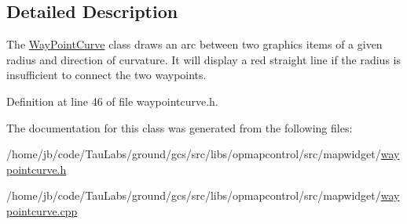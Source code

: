\subsection{\-Detailed \-Description}
\-The \hyperlink{classmapcontrol_1_1_way_point_curve}{\-Way\-Point\-Curve} class draws an arc between two graphics items of a given radius and direction of curvature. \-It will display a red straight line if the radius is insufficient to connect the two waypoints. 

\-Definition at line 46 of file waypointcurve.\-h.



\-The documentation for this class was generated from the following files\-:\begin{DoxyCompactItemize}
\item 
/home/jb/code/\-Tau\-Labs/ground/gcs/src/libs/opmapcontrol/src/mapwidget/\hyperlink{waypointcurve_8h}{waypointcurve.\-h}\item 
/home/jb/code/\-Tau\-Labs/ground/gcs/src/libs/opmapcontrol/src/mapwidget/\hyperlink{waypointcurve_8cpp}{waypointcurve.\-cpp}\end{DoxyCompactItemize}
